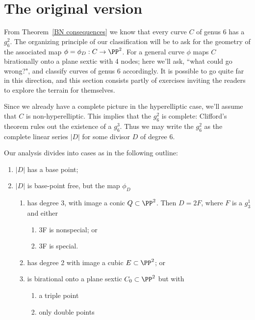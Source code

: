 \section{The original version}

From Theorem~\ref{BN consequences}  we know that every curve $C$ of genus 6 has a $g^{2}_{6}$. The organizing principle of our classification will be to ask for the geometry of the associated map $\phi = \phi_D : C \to \PP^2$. For a general curve  $\phi$ maps $C$ birationally onto a plane sextic with 4 nodes; here we'll ask, ``what could go wrong?", and classify curves of genus 6 accordingly. It is possible to go quite far 
in this direction, and this section consists partly of exercises inviting the readers to explore the terrain for themselves.

Since we already have a complete picture in the hyperelliptic case, we'll assume that $C$ is non-hyperelliptic. This implies that  the $g^2_6$ is complete: Clifford's theorem rules out
the existence of a $g^3_6$. Thus we may write the $g^{2}_{6}$ as the complete linear series
$|D|$ for some divisor $D$ of degree 6.


Our analysis  divides into cases as in the following outline:
\begin{enumerate}
 \item $|D|$ has a base point;
 \item $|D|$ is base-point free, but the map $\phi_{D}$
 
\begin{enumerate}
\item has degree 3, with image a conic $Q \subset \PP^2$. Then $D= 2F$, where $F$ is a $g^{1}_{3}$ and either
\begin{enumerate}
 \item 3F is nonspecial; or
 \item 3F is special.
\end{enumerate}
\item has degree 2 with image a cubic  $E \subset \PP^2$; or
\item is birational onto a plane sextic $C_0\subset \PP^2$ but with 
\begin{enumerate}
 \item a triple point
 \item only double points
\end{enumerate}
\end{enumerate}
\end{enumerate}



